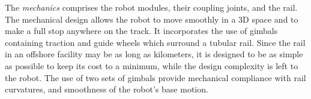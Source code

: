 \documentclass{ifacconf}
\begin{document}


%

The \emph{mechanics} comprises the robot modules, their coupling joints, and
the rail. The mechanical design allows the robot to move smoothly in a 3D space
and to make a full stop anywhere on the track. It incorporates the use of gimbals
containing traction and guide wheels which surround a tubular rail. Since the
rail in an offshore facility may be as long as kilometers, it
is designed to be as simple as possible to keep its cost to a minimum, while the
design complexity is left to the robot. The use of two sets of gimbals provide
mechanical compliance with rail curvatures, and smoothness of the robot's base
motion.
\end{document}
